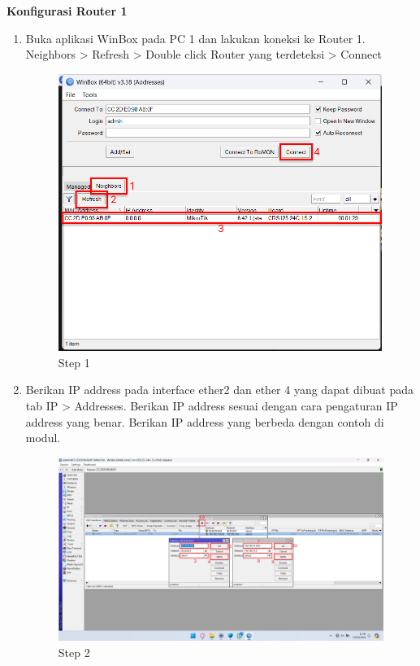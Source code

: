 \begin{center}
	\textbf{Konfigurasi Router 1}
	\begin{enumerate}
		\item Buka aplikasi WinBox pada PC 1 dan lakukan koneksi ke Router 1. Neighbors > Refresh > Double click Router yang terdeteksi > Connect
		\begin{figure}[H]
			\centering
			\includegraphics[width=0.8\linewidth]{P2/img/per1/pc1/Step 1.png}
			\caption{Step 1}
			\label{fig:Step 1(Per.1 PC1)}
		\end{figure}
		\item Berikan IP address pada interface ether2 dan ether 4 yang dapat dibuat pada tab IP > Addresses. Berikan IP address sesuai dengan cara pengaturan IP address yang benar. Berikan IP address yang berbeda dengan contoh di modul.
		\begin{figure}[H]
			\centering
			\includegraphics[width=0.9\linewidth]{P2/img/per1/pc1/Step 2.png}
			\caption{Step 2}
			\label{fig:Step 2(Per.1 PC1)}
		\end{figure}

\end{enumerate}
\end{center}
